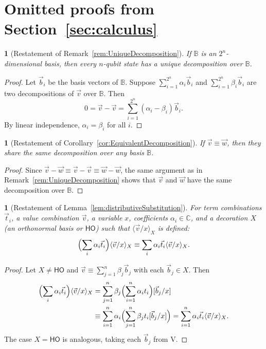 \documentclass[a4paper,UKenglish,numberwithinsect,pdfa,anonymous]{lipics-v2021}
\theoremstyle{restatestyle}
\newtheorem*{restatecorollary}{}
\newtheorem*{restatelemma}{}
\newtheorem*{restateremark}{}
\newcommand\s[1]{\ensuremath{\mathsf{#1}}}
\newcommand\Val{{\s V}}
\newcommand\ansubst[2]{\ensuremath{\langle #1 \rangle_{#2}}}
\newcommand\AbsBasis{\ensuremath{\mathsf{H\!O}}}
\def\C{\mathbb{C}}            %
\def\Val{\mathrm{V}}          %
\def\BB{\mathbb{B}}
\begin{document}


\appendix

\section{Omitted proofs from Section~\ref{sec:calculus}}\label{sec:appendixA}

\begin{restateremark}[Restatement of Remark~\ref{rem:UniqueDecomposition}]
  \itshape
  If $\BB$ is an $2^n$-dimensional basis, then every $n$-qubit state has
  a unique decomposition over $\BB$.
\end{restateremark}
\begin{proof}
  Let $\vec{b}_{i}$ be the basis vectors of $\BB$. Suppose
  $\sum_{i=1}^{2^n} \alpha_i \vec{b}_{i}$ and $\sum_{i=1}^{2^n} \beta_i \vec{b}_{i}$
  are two decompositions of $\vec{v}$ over $\BB$. Then
  \[
    0=\vec{v}-\vec{v}=\sum_{i=1}^{2^n}(\alpha_i-\beta_i)\vec{b}_{i}.
  \]
  By linear independence, $\alpha_i=\beta_i$ for all $i$.
\end{proof}

\begin{restatecorollary}[Restatement of Corollary~\ref{cor:EquivalentDecomposition}]
  \itshape
  If $\vec{v}\equiv\vec{w}$, then they share the same decomposition over any
  basis $\BB$.
\end{restatecorollary}
\begin{proof}
  Since $\vec{v}-\vec{w}\equiv\vec{v}-\vec{v}\equiv\vec{w}-\vec{w}$, the same
  argument as in Remark~\ref{rem:UniqueDecomposition} shows that $\vec{v}$ and $\vec{w}$ have the same decomposition over $\BB$.
\end{proof}

\begin{restatelemma}[Restatement of Lemma~\ref{lem:distributiveSubstitution}]
  \itshape
  For term combinations $\vec{t}_{i}$, a value combination $\vec{v}$, a
  variable $x$, coefficients $\alpha_i\in\C$, and a decoration $X$ (an
  orthonormal basis or $\AbsBasis$) such that $\ansubst{\vec v/x}{X}$ is defined:
  \[
    \Bigl(\sum_i \alpha_i\vec{t}_{i}\Bigr)\ansubst{\vec v/x}{X}
    \equiv
    \sum_i \alpha_i\vec{t}_{i} \ansubst{\vec v/x}{X}.
  \]
\end{restatelemma}
\begin{proof}
  Let $X\neq\AbsBasis$ and
  $\vec{v}\equiv\sum_{j=1}^n\beta_j\vec{b}_{j}$ with each $\vec{b}_{j}\in X$.
  Then
  \begin{align*}
    \Bigl(\sum_i \alpha_i\vec{t}_{i}\Bigr)\ansubst{\vec v/x}{X}
    &= \sum_{j=1}^n \beta_j\Bigl(\sum_{i=1}^{n}\alpha_i t_i\Bigr)[\vec{b}_{j}/x]\\
    &\equiv \sum_{i=1}^{n}\alpha_i\Bigl(\sum_{j=1}^n\beta_j t_i[\vec{b}_{j}/x]\Bigr)
    = \sum_{i=1}^{n}\alpha_i\vec{t}_{i}\ansubst{\vec v/x}{X}.
  \end{align*}
  The case $X=\AbsBasis$ is analogous, taking each $\vec{b}_j$ from $\Val$.
\end{proof}
\end{document}
